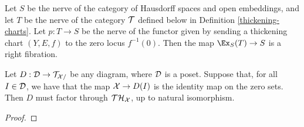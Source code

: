\begin{prop}\label{presheaf-of-implicit-structures}
 Let $S$ be the nerve of the category of Hausdorff spaces and open embeddings, and let $T$ be the nerve of the category $\mathcal T$ defined below in Definition \ref{thickening-charts}. Let $p: T \to S$ be the nerve of the functor given by sending a thickening chart $(Y, E, f)$ to the zero locus $f^{-1}(0)$. Then the map $\Ex_S(T) \to S$ is a right fibration.
\end{prop}

\begin{lemma}\label{vector-bundle-diagrams}
Let $D: \mathcal D \to \mathcal T_{\mathcal X /}$ be any diagram, where $\mathcal D$ is a poset. Suppose that, for all $I \in \mathcal D$, we have that the map $\mathcal X \to D(I)$ is the identity map on the zero sets. Then $D$ must factor through ${\mathcal T \mathcal H}_\mathcal X$, up to natural isomorphism.
\end{lemma}

\begin{proof}
\jake{[To be done.]}
\end{proof}


